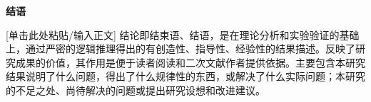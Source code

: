 \begin{center}
	\vspace*{-2mm}
	\heiti\fontsize{16}{16}\selectfont\textbf{结\hspace{5.7mm}语}
\end{center}

[单击此处粘贴/输入正文]
结论即结束语、结语，是在理论分析和实验验证的基础上，通过严密的逻辑推理得出的有创造性、指导性、经验性的结果描述。反映了研究成果的价值，其作用是便于读者阅读和二次文献作者提供依据。主要包含本研究结果说明了什么问题，得出了什么规律性的东西，或解决了什么实际问题；本研究的不足之处、尚待解决的问题或提出研究设想和改进建议。
